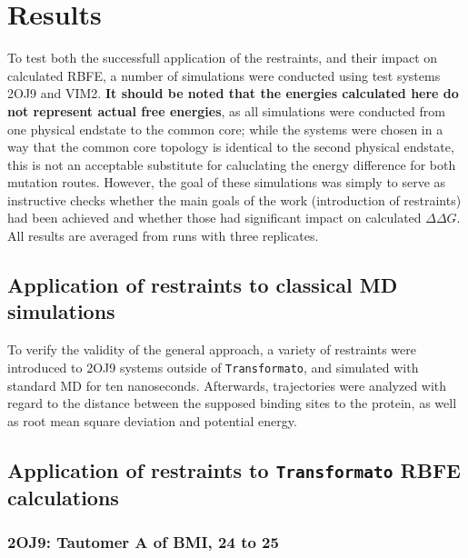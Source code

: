 \documentclass[oneside]{scrreprt}
\begin{document}
\chapter{Results}
To test both the successfull application of the restraints, and their impact on calculated RBFE, a number of simulations were conducted using test systems 2OJ9 and VIM2. \textbf{It should be noted that the energies calculated here do not represent actual free energies}, as all simulations were conducted from one physical endstate to the common core; while the systems were chosen in a way that the common core topology is identical to the second physical endstate, this is not an acceptable substitute for caluclating the energy difference for both mutation routes. However, the goal of these simulations was simply to serve as instructive checks whether the main goals of the work (introduction of restraints) had been achieved and whether those had significant impact on calculated $ \Delta \Delta G$. All results are averaged from runs with three replicates.
\section{Application of restraints to classical MD simulations}

To verify the validity of the general approach, a variety of restraints were introduced to 2OJ9 systems outside of \texttt{Transformato}, and simulated with standard MD for ten nanoseconds. Afterwards, trajectories were analyzed with regard to the distance between the supposed binding sites to the protein, as well as root mean square deviation and potential energy.
\section{Application of restraints to \texttt{Transformato} RBFE calculations}
\newpage
\subsection{2OJ9: Tautomer A of BMI, 24 to 25}
\end{document}
